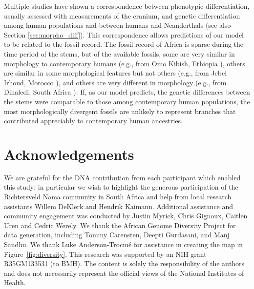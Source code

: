 \documentclass[]{article}
\begin{document}
Multiple studies have shown a correspondence between phenotypic
differentiation, usually assessed with measurements of the cranium, and genetic
differentiation among human populations and between humans and Neanderthals
\citep{Relethford1994-mh,Weaver2008-ho,Von_Cramon-Taubadel2009-zb}
(see also Section \ref{sec:morpho_diff}).
This correspondence allows predictions of our model to be related to the fossil record.
The fossil record of Africa is sparse during the time period of the stems, but of the
available fossils, some are very similar in morphology to contemporary humans
(e.g., from Omo Kibish, Ethiopia \citep{Day1969-rh,Vidal2022-qe}),
others are similar in some morphological features but not others
(e.g., from Jebel Irhoud, Morocco \citep{Hublin2017-cq,Richter2017-zu}),
and others are very different in morphology
(e.g., from Dinaledi, South Africa \citep{Berger2015-bq,Dirks2017-uk}).
If, as our model predicts, the
genetic differences between the stems were comparable to those among
contemporary human populations, the most morphologically divergent fossils are unlikely to
represent branches that contributed appreciably to contemporary human
ancestries.

\section*{Acknowledgements}

We are grateful for the DNA contribution from each participant which enabled
this study; in particular we wish to highlight the generous participation of
the Richtersveld Nama community in South Africa and help from local research
assistants Willem DeKlerk and Hendrik Kaimann. Additional assistance and
community engagement was conducted by Justin Myrick, Chris Gignoux, Caitlen
Uren and Cedric Werely. We thank the African Genome Diversity Project for data
generation, including Tommy Carensten, Deepti Gurdasani, and Manj Sandhu. We
thank Luke Anderson-Trocm\'e for assistance in creating the map in
Figure~\ref{fig:diversity}. This research was supported by an NIH grant R35GM133531 (to
BMH). The content is solely the responsibility of the authors and does
not necessarily represent the official views of the National Institutes of
Health.



\end{document}
